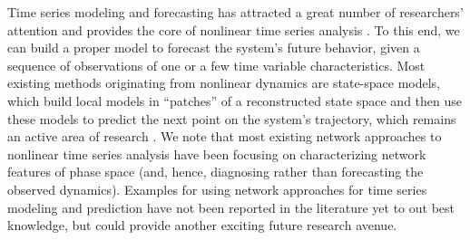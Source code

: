 Time series modeling and forecasting has attracted a great number of researchers' attention and provides the core of nonlinear time series analysis \cite{kantz1997,Bradley2015c}. To this end, we can build a proper model to forecast the system's future behavior, given a sequence of observations of one or a few time variable characteristics. Most existing methods originating from nonlinear dynamics are state-space models, which build local models in ``patches'' of a reconstructed state space and then use these models to predict the next point on the system's trajectory, which remains an active area of research \cite{Bradley2015c}. We note that most existing network approaches to nonlinear time series analysis have been focusing on characterizing network features of phase space (and, hence, diagnosing rather than forecasting the observed dynamics). Examples for using network approaches for time series modeling and prediction have not been reported in the literature yet to out best knowledge, but could provide another exciting future research avenue.
